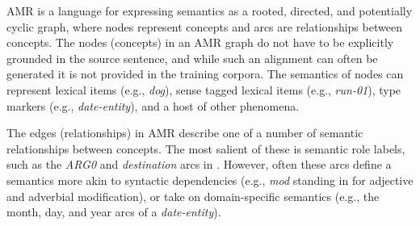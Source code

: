 \documentclass[11pt]{article}
\newcommand\w[1]{\textit{#1}} %
\begin{document}






AMR is a language for expressing semantics as a rooted, directed, and potentially cyclic graph, where nodes represent concepts and arcs are relationships between concepts.
The nodes (concepts) in an AMR graph do not have to be explicitly grounded in the source sentence, and while such an alignment can often be generated it is not provided in the training corpora.
The semantics of nodes can represent lexical items (e.g., \w{dog}), sense tagged lexical items (e.g., \textit{run-01}), type markers (e.g., \textit{date-entity}), and a host of other phenomena.

The edges (relationships) in AMR describe one of a number of semantic relationships between concepts.
The most salient of these is semantic role labels, such as the \w{ARG0} and \w{destination} arcs in .
However, often these arcs define a semantics more akin to syntactic dependencies (e.g., \textit{mod} standing in for adjective and adverbial modification), or take on domain-specific semantics (e.g., the month, day, and year arcs of a \textit{date-entity}).
\end{document}
